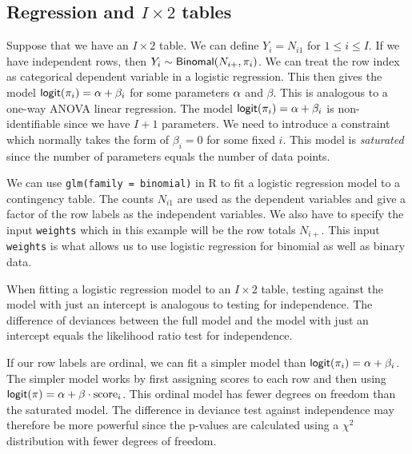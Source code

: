 \subsection{Regression and $I\times 2$ tables}
Suppose that we have an $I \times 2$ table. We can define $Y_i=N_{i1}$ for $1\le i \le  I$. If we have independent rows, then $Y_i \sim \mathsf{Binomal}(N_{i+},\pi_i)$. We can treat the row index as categorical dependent variable in a logistic regression. This then gives the model $\mathsf{logit}(\pi_i) ={\alpha}+\beta_i$ for some parameters ${\alpha}$ and $\beta$. This is analogous to a one-way ANOVA linear regression. The model $\mathsf{logit}(\pi_i) ={\alpha}+\beta_i$ is  non-identifiable since we have $I+1$ parameters. We need to introduce a constraint which normally takes the form of $\beta_i=0$ for some fixed $i$. This model is \emph{saturated} since the number of parameters equals the number of data points.  

We can use \texttt{glm(family = binomial)} in R to fit a logistic regression model to a contingency table. The counts  $N_{i1}$ are used as the dependent variables and give  a factor of the row labels as the independent variables. We also have to specify the input \texttt{weights} which in this example will   be the row totals $N_{i+}$. This input \texttt{weights} is what  allows us to  use logistic regression for binomial as well as  binary data. 

When fitting a logistic regression model to an $I\times 2$ table, testing against the  model with just an intercept is analogous  to  testing for independence. The difference of deviances between the full model and the model with just an intercept equals  the likelihood ratio test for independence. 

If our row labels are ordinal, we can fit a simpler model than $\mathsf{logit}(\pi_i)=\alpha+\beta_i$. The simpler model works by first assigning scores to each row and then using $\mathsf{logit}(\pi)={\alpha}+\beta\cdot \text{score}_i$. This ordinal model has fewer degrees on freedom than the saturated model. The difference in deviance test against independence may therefore be more powerful since the p-values are calculated using a $\chi^2$ distribution with fewer degrees of freedom. 
